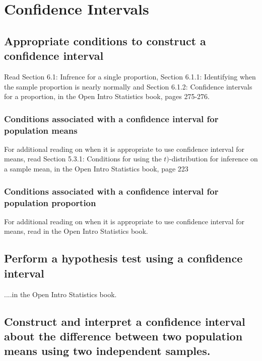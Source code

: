 \setcounter{chapter}{7}
\chapter{Confidence Intervals}

\section[Conditions]{Appropriate conditions to construct a confidence interval}

Read Section 6.1: Infrence for a single proportion, Section 6.1.1: Identifying when the sample proportion is nearly normally and Section 6.1.2: Confidence intervals for a proportion, in the Open Intro Statistics book, pages 275-276.  

\subsection[CI for Mean Conditions]{Conditions associated with a confidence interval for population means}

For additional reading on when it is appropriate to use confidence interval for means, read Section 5.3.1: Conditions for using the \(t)\)-distribution for inference on a sample mean, in the Open Intro Statistics book, page 223

\subsection[CI for Proportion Conditions]{Conditions associated with a confidence interval for population proportion}

For additional reading on when it is appropriate to use confidence interval for means, read in the Open Intro Statistics book.

\section[CI as Hypothesis Test]{Perform a hypothesis test using a confidence interval}

....in the Open Intro Statistics book.

\section[CI for Difference of Means]{Construct and interpret a confidence interval about the difference between two population means using two independent samples.}

